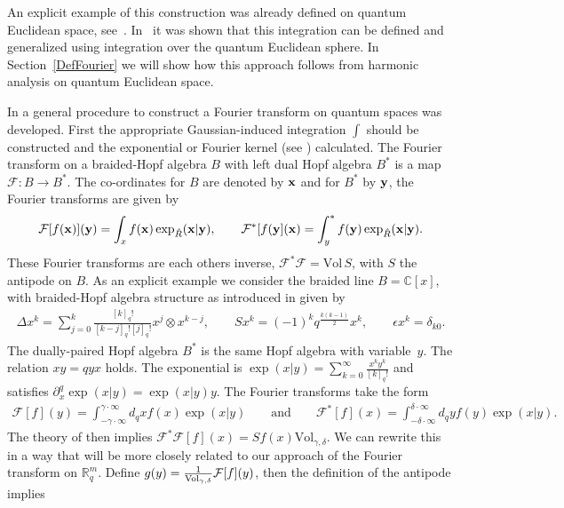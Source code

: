 \documentclass[pdftex]{sigma}
\newcommand{\mR}{\mathbb{R}}
\newcommand{\mC}{\mathbb{C}}
\newcommand{\cF}{\mathcal{F}}
\numberwithin{equation}{section}
\begin{document}
An explicit example of this construction was already def\/ined on quantum Euclidean space, see~\cite{MR1239953}. In~\cite{MR1408120} it was shown that this integration can be def\/ined and generalized using integration over the quantum Euclidean sphere. In Section~\ref{DefFourier} we will show how this approach follows from harmonic analysis on quantum Euclidean space.


In \cite{MR1303081} a general procedure to construct a Fourier transform on quantum spaces was developed. First the appropriate Gaussian-induced integration $\int$ should be constructed and the exponential or Fourier kernel (see \cite{MR1235979, MR2099760}) calculated. The Fourier transform on a braided-Hopf algebra $B$ with left dual Hopf algebra $B^\ast$  is a map $\cF:B\to B^\ast$. The co-ordinates for $B$ are denoted by $\bold{x}$ and for $B^\ast$ by $\bold{y}$, the Fourier transforms are given by
\begin{gather*}
\cF[f(\bold{x})](\bold{y})=\int_x f(\bold{x})\exp_{\hat{R}}(\bold{x}|\bold{y}), \qquad \cF^\ast[f(\bold{y}](\bold{x})=\int^\ast_y f(\bold{y})\exp_{\hat{R}}(\bold{x}|\bold{y}).
\end{gather*}
These Fourier transforms are each others inverse, $\cF^\ast\cF=\mbox{Vol}\, S$, with $S$ the antipode on $B$. As an explicit example we consider the braided line $B=\mC[x]$, with braided-Hopf algebra structure as introduced in \cite{MR1182915} given by
\begin{gather*}
\Delta x^k=\sum_{j=0}^k\frac{[k]_q!}{[k-j]_q![j]_q!}x^j\otimes x^{k-j},\qquad Sx^k=(-1)^kq^{\frac{k(k-1)}{2}}x^k,\qquad\epsilon x^k=\delta_{k0}.
\end{gather*}
The dually-paired Hopf algebra $B^\ast$ is the same Hopf algebra with variable~$y$. The relation $xy=qyx$ holds. The exponential is $\exp(x|y)=\sum\limits_{k=0}^\infty\frac{x^ky^k}{[k]_q!}$ and satisf\/ies $\partial_x^q\exp(x|y)=\exp(x|y)y$. The Fourier transforms take the form
\begin{gather}
\label{Fourline}
\cF[f](y)=\int_{-\gamma\cdot\infty}^{\gamma\cdot\infty}d_qxf(x)\exp(x|y) \qquad \mbox{and}\qquad \cF^\ast[f](x)=\int_{-\delta\cdot\infty}^{\delta\cdot\infty}d_qyf(y)\exp(x|y).
\end{gather}
The theory of \cite{MR1303081} then implies $\cF^\ast\cF[f](x)=Sf(x)\mbox{Vol}_{\gamma,\delta}$. We can rewrite this in a way that will be more closely related to our approach of the Fourier transform on $\mR^m_q$. Def\/ine $g(y)=\frac{1}{{\rm Vol}_{\gamma,\delta}}\cF[f](y)$, then the def\/inition of the antipode implies
\end{document}
